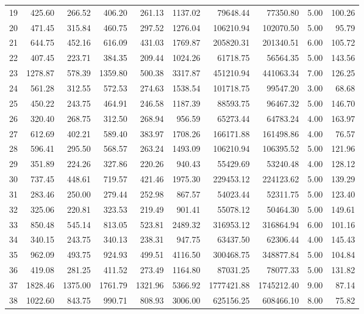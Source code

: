 \begin{tabular}{lrrrrrrrrr}
19 & 425.60 & 266.52 & 406.20 & 261.13 & 1137.02 & 79648.44 & 77350.80 & 5.00 & 100.26 \\
20 & 471.45 & 315.84 & 460.75 & 297.52 & 1276.04 & 106210.94 & 102070.50 & 5.00 & 95.79 \\
21 & 644.75 & 452.16 & 616.09 & 431.03 & 1769.87 & 205820.31 & 201340.51 & 6.00 & 105.72 \\
22 & 407.45 & 223.71 & 384.35 & 209.44 & 1024.26 & 61718.75 & 56564.35 & 5.00 & 143.56 \\
23 & 1278.87 & 578.39 & 1359.80 & 500.38 & 3317.87 & 451210.94 & 441063.34 & 7.00 & 126.25 \\
24 & 561.28 & 312.55 & 572.53 & 274.63 & 1538.54 & 101718.75 & 99547.20 & 3.00 & 68.68 \\
25 & 450.22 & 243.75 & 464.91 & 246.58 & 1187.39 & 88593.75 & 96467.32 & 5.00 & 146.70 \\
26 & 320.40 & 268.75 & 312.50 & 268.94 & 956.59 & 65273.44 & 64783.24 & 4.00 & 163.97 \\
27 & 612.69 & 402.21 & 589.40 & 383.97 & 1708.26 & 166171.88 & 161498.86 & 4.00 & 76.57 \\
28 & 596.41 & 295.50 & 568.57 & 263.24 & 1493.09 & 106210.94 & 106395.52 & 5.00 & 121.96 \\
29 & 351.89 & 224.26 & 327.86 & 220.26 & 940.43 & 55429.69 & 53240.48 & 4.00 & 128.12 \\
30 & 737.45 & 448.61 & 719.57 & 421.46 & 1975.30 & 229453.12 & 224123.62 & 5.00 & 139.29 \\
31 & 283.46 & 250.00 & 279.44 & 252.98 & 867.57 & 54023.44 & 52311.75 & 5.00 & 123.40 \\
32 & 325.06 & 220.81 & 323.53 & 219.49 & 901.41 & 55078.12 & 50464.30 & 5.00 & 149.61 \\
33 & 850.48 & 545.14 & 813.05 & 523.81 & 2489.32 & 316953.12 & 316864.94 & 6.00 & 101.16 \\
34 & 340.15 & 243.75 & 340.13 & 238.31 & 947.75 & 63437.50 & 62306.44 & 4.00 & 145.43 \\
35 & 962.09 & 493.75 & 924.93 & 499.51 & 4116.50 & 300468.75 & 348877.84 & 5.00 & 104.84 \\
36 & 419.08 & 281.25 & 411.52 & 273.49 & 1164.80 & 87031.25 & 78077.33 & 5.00 & 131.82 \\
37 & 1828.46 & 1375.00 & 1761.79 & 1321.96 & 5366.92 & 1777421.88 & 1745212.40 & 9.00 & 87.14 \\
38 & 1022.60 & 843.75 & 990.71 & 808.93 & 3006.00 & 625156.25 & 608466.10 & 8.00 & 75.82 \\

\end{tabular}
